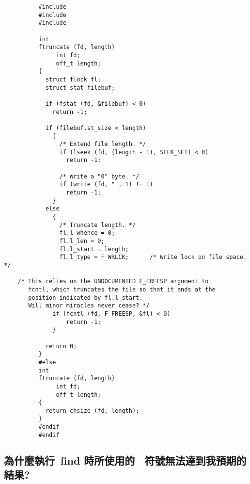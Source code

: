 \documentclass{article}
\begin{document}
\begin{CJK*}{Bg5}{ming}
\begin{verbatim}
	      #include 
	      #include 
	      #include 

	      int
	      ftruncate (fd, length)
	           int fd;
	           off_t length;
	      {
	        struct flock fl;
	        struct stat filebuf;

	        if (fstat (fd, &filebuf) < 0)
	          return -1;

	        if (filebuf.st_size < length)
	          {
        	    /* Extend file length. */
	            if (lseek (fd, (length - 1), SEEK_SET) < 0)
	              return -1;

	            /* Write a "0" byte. */
	            if (write (fd, "", 1) != 1)
        	      return -1;
	          }
	        else
	          {
	            /* Truncate length. */
	            fl.l_whence = 0;
	            fl.l_len = 0;
	            fl.l_start = length;
	            fl.l_type = F_WRLCK;      /* Write lock on file space. */

	/* This relies on the UNDOCUMENTED F_FREESP argument to
	   fcntl, which truncates the file so that it ends at the
	   position indicated by fl.l_start.
	   Will minor miracles never cease? */
	          if (fcntl (fd, F_FREESP, &fl) < 0)
	              return -1;
	          }

	        return 0;
	      }
	      #else
	      int
	      ftruncate (fd, length)
	           int fd;
	           off_t length;
	      {
	        return chsize (fd, length);
	      }
	      #endif
	      #endif
\end{verbatim}
\normalsize

\subsection{為什麼執行~find 時所使用的~{} 符號無法達到我預期的結果?}


\end{CJK*}
\end{document}
